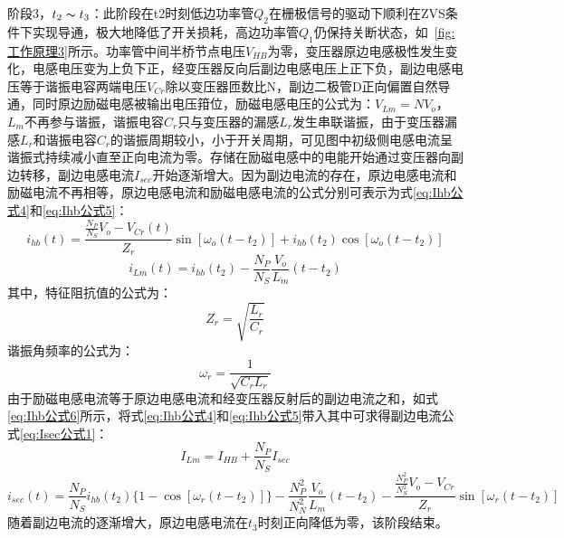 阶段3，$t_2 \thicksim t_3$：此阶段在t2时刻低边功率管$Q_2$在栅极信号的驱动下顺利在ZVS条件下实现导通，极大地降低了开关损耗，高边功率管$Q_1$仍保持关断状态，如~\ref{fig:工作原理3}所示。功率管中间半桥节点电压$V_{HB}$为零，变压器原边电感极性发生变化，电感电压变为上负下正，经变压器反向后副边电感电压上正下负，副边电感电压等于谐振电容两端电压$V_{Cr}$除以变压器匝数比N，副边二极管D正向偏置自然导通，同时原边励磁电感被输出电压箝位，励磁电感电压的公式为：$V_{Lm}=NV_o$，$L_m$不再参与谐振，谐振电容$C_r$只与变压器的漏感$L_r$发生串联谐振，由于变压器漏感$L_r$和谐振电容$C_r$的谐振周期较小，小于开关周期，可见图中初级侧电感电流呈谐振式持续减小直至正向电流为零。存储在励磁电感中的电能开始通过变压器向副边转移，副边电感电流$I_{sec}$开始逐渐增大。因为副边电流的存在，原边电感电流和励磁电流不再相等，原边电感电流和励磁电感电流的公式分别可表示为式\eqref{eq:Ihb公式4}和\eqref{eq:Ihb公式5}：
\begin{equation}
    \label{eq:Ihb公式4}
    i_{hb}(t) = \frac{\frac{N_P}{N_S}V_o - V_{Cr}(t)}{Z_r}\sin[\omega_o(t-t_2)] + i_{hb}(t_2) \cos[\omega_o(t-t_2)]  
\end{equation}
\begin{equation}
    \label{eq:Ihb公式5}
    i_{Lm}(t) = i_{hb}(t_2) - \frac{N_P}{N_S} \frac{V_o}{L_m}(t-t_2)
\end{equation}
其中，特征阻抗值的公式为：
\begin{equation}
    \label{eq:Zr公式}
    Z_r=\sqrt{\frac{L_r}{C_r}}  
\end{equation}
谐振角频率的公式为：
\begin{equation}
    \label{eq:omega_r公式}
    \omega_r=\frac{1}{\sqrt{C_r L_r}}
\end{equation}
由于励磁电感电流等于原边电感电流和经变压器反射后的副边电流之和，如式\eqref{eq:Ihb公式6}所示，将式\eqref{eq:Ihb公式4}和\eqref{eq:Ihb公式5}带入其中可求得副边电流公式\eqref{eq:Isec公式1}：
\begin{equation}
    \label{eq:Ihb公式6}
    I_{Lm} = I_{HB} + \frac{N_P}{N_S}I_{sec}
\end{equation}
\begin{equation}
    \label{eq:Isec公式1}
    i_{sec}(t) 
    = \frac{N_P}{N_S} i_{hb}(t_2) \{  1 - \cos[\omega_r(t-t_2)]\}  - \frac{N_P^2}{N_N^2} \frac{V_o}{L_m} (t-t_2)
    - \frac{\frac{N_P^2}{N_S^2} V_o - V_{Cr}}{Z_r} \sin[\omega_r(t-t_2)]
\end{equation}
随着副边电流的逐渐增大，原边电感电流在$t_3$时刻正向降低为零，该阶段结束。



